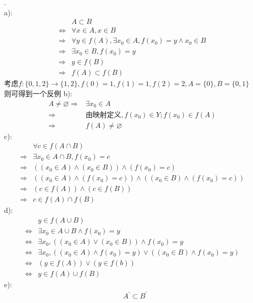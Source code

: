 \begin{solution}.\\
a):\\
\begin{align*}
&A\subset B\\
\Leftrightarrow& \forall x\in A, x\in B\\
\Rightarrow& \forall y\in f(A),\exists x_0\in A,f(x_0)=y\land x_0\in B\\
\Rightarrow& \exists x_0\in B,f(x_0)=y\\
\Rightarrow& y\in f(B)\\
\Rightarrow& f(A)\subset f(B)
\end{align*}
考虑$f:\{0,1,2\}\to \{1,2\},f(0)=1,f(1)=1,f(2)=2,A=\{0\},B=\{0,1\}$\\
则可得到一个反例
b):\\
\begin{align*}
A\neq \varnothing\Rightarrow& \exists x_0\in A\\
\Rightarrow&\text{由映射定义},f(x_0)\in Y;f(x_0)\in f(A)\\
\Rightarrow&f(A)\neq \varnothing
\end{align*}
c):\\
\begin{align*}
&\forall c\in f(A\cap B)\\
\Rightarrow& \exists x_0\in A\cap B, f(x_0)=c\\
\Rightarrow& ((x_0\in A)\land(x_0\in B))\land (f(x_0)=c)\\
\Rightarrow& ((x_0\in A)\land (f(x_0)=c))\land ((x_0\in B)\land (f(x_0)=c))\\
\Rightarrow& (c\in f(A))\land (c\in f(B))\\
\Rightarrow& c\in f(A)\cap f(B)
\end{align*}
d):\\
\begin{align*}
&y\in f(A\cup B)\\
\Leftrightarrow& \exists x_0\in A\cup B \land f(x_0)=y\\
\Leftrightarrow& \exists x_0, ((x_0\in A)\lor (x_0\in B))\land f(x_0)=y\\
\Leftrightarrow& \exists x_0, ((x_0\in A)\land f(x_0)=y)\lor((x_0\in B)\land f(x_0)=y)\\
\Leftrightarrow& (y\in f(A))\lor(y\in f(b))\\
\Leftrightarrow& y\in f(A)\cup f(B)
\end{align*}
e):\\
\begin{align*}
&A^\prime \subset B^\prime\\

\end{align*}
\end{solution}
